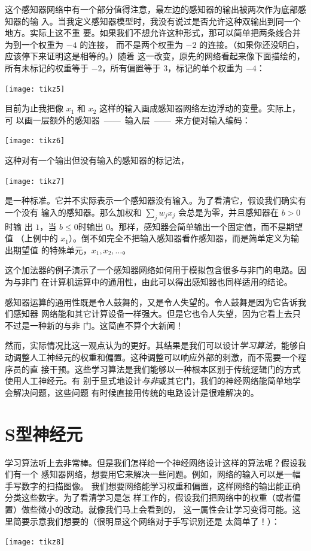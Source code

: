 这个感知器网络中有一个部分值得注意，最左边的感知器的输出被两次作为底部感知器的输
入。当我定义感知器模型时，我没有说过是否允许这种双输出到同一个地方。实际上这不重
要。如果我们不想允许这种形式，那可以简单把两条线合并为到一个权重为 $-4$ 的连接，
而不是两个权重为 $-2$ 的连接。（如果你还没明白，应该停下来证明这是相等的。）随着
这一改变，原先的网络看起来像下面描绘的，所有未标记的权重等于 $-2$，所有偏置等于
$3$，标记的单个权重为 $-4$：
\begin{center}
  \texttt{[image: tikz5]}
\end{center}

目前为止我把像 $x_1$ 和 $x_2$ 这样的输入画成感知器网络左边浮动的变量。实际上，可
以画一层额外的感知器~——~输入层~——~来方便对输入编码：
\begin{center}
  \texttt{[image: tikz6]}
\end{center}

这种对有一个输出但没有输入的感知器的标记法，
\begin{center}
  \texttt{[image: tikz7]}
\end{center}
是一种标准。它并不实际表示一个感知器没有输入。为了看清它，假设我们确实有一个没有
输入的感知器。那么加权和 $\sum_j w_j x_j$ 会总是为零，并且感知器在 $b > 0$ 时输
出 $1$，当 $b \leq 0$时输出 $0$。那样，感知器会简单输出一个固定值，而不是期望值
（上例中的 $x_1$）。倒不如完全不把输入感知器看作感知器，而是简单定义为输出期望值
的特殊单元，$x_1, x_2,\ldots$。

这个加法器的例子演示了一个感知器网络如何用于模拟包含很多与非门的电路。因为与非门
在计算机运算中的通用性，由此可以得出感知器也同样适用的结论。

感知器运算的通用性既是令人鼓舞的，又是令人失望的。令人鼓舞是因为它告诉我们感知器
网络能和其它计算设备一样强大。但是它也令人失望，因为它看上去只不过是一种新的与非
门。这简直不算个大新闻！

然而，实际情况比这一观点认为的更好。其结果是我们可以设计\emph{学习算法}，能够自
动调整人工神经元的权重和偏置。这种调整可以响应外部的刺激，而不需要一个程序员的直
接干预。这些学习算法是我们能够以一种根本区别于传统逻辑门的方式使用人工神经元。有
别于显式地设计\emph{与非}或其它门，我们的神经网络能简单地学会解决问题，这些问题
有时候直接用传统的电路设计是很难解决的。

\section{S型神经元}
\label{seq:sigmoid_neurons}

学习算法听上去非常棒。但是我们怎样给一个神经网络设计这样的算法呢？假设我们有一个
感知器网络，想要用它来解决一些问题。例如，网络的输入可以是一幅手写数字的扫描图像。
我们想要网络能学习权重和偏置，这样网络的输出能正确分类这些数字。为了看清学习是怎
样工作的，假设我们把网络中的权重（或者偏置）做些微小的改动。就像我们马上会看到的，
这一属性会让学习变得可能。这里简要示意我们想要的（很明显这个网络对于手写识别还是
  太简单了！）：
\begin{center}
  \texttt{[image: tikz8]}  
\end{center}

